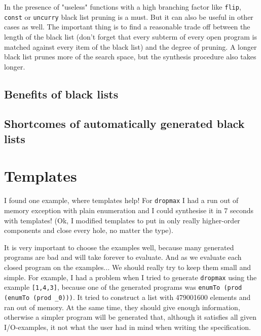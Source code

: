 In the presence of "useless" functions with a high branching factor like \lstinline?flip?, \lstinline?const? or \lstinline?uncurry? black list pruning is a must. But it can also be useful in other cases as well. The important thing is to find a reasonable trade off between the length of the black list (don't forget that every subterm of every open program is matched against every item of the black list) and the degree of pruning. A longer black list prunes more of the search space, but the synthesis procedure also takes longer.

  \subsection{Benefits of black lists}
  \subsection{Shortcomes of automatically generated black lists}

\section{Templates}
I found one example, where templates help! For \lstinline?dropmax? I had a run out of memory exception with plain enumeration and I could synthesise it in 7 seconds with templates!
(Ok, I modified templates to put in only really higher-order components and close every hole, no matter the type).

It is very important to choose the examples well, because many generated programs are bad and will take forever to evaluate. And as we evaluate each closed program on the examples... We should really try to keep them small and simple.
For example, I had a problem when I tried to generate \lstinline?dropmax? using the example \lstinline?[1,4,3]?, because one of the generated programs was \lstinline?enumTo (prod (enumTo (prod _0)))?. It tried to construct a list with 479001600 elements and ran out of memory.
At the same time, they should give enough information, otherwise a simpler program will be generated that, although it satisfies all given I/O-examples, it not what the user had in mind when writing the specification.

